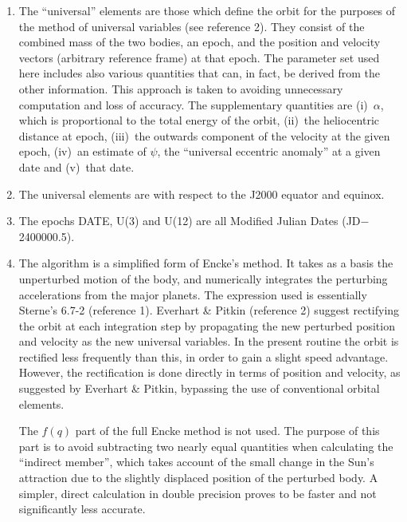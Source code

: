 \documentclass[11pt,twoside,nolof]{starlink}
\begin{document}
{
 \begin{enumerate}
  \setlength{\parskip}{\medskipamount}
  \item The ``universal'' elements are those which define the orbit for the
        purposes of the method of universal variables (see reference 2).
        They consist of the combined mass of the two bodies, an epoch,
        and the position and velocity vectors (arbitrary reference frame)
        at that epoch.  The parameter set used here includes also various
        quantities that can, in fact, be derived from the other
        information.  This approach is taken to avoiding unnecessary
        computation and loss of accuracy.  The supplementary quantities
        are (i)~$\alpha$, which is proportional to the total energy of the
        orbit, (ii)~the heliocentric distance at epoch,
        (iii)~the outwards component of the velocity at the given epoch,
        (iv)~an estimate of $\psi$, the ``universal eccentric anomaly'' at a
        given date and (v)~that date.

  \item The universal elements are with respect to the J2000 equator and
        equinox.

  \item The epochs DATE, U(3) and U(12) are all Modified Julian Dates
        (JD$-$2400000.5).

  \item The algorithm is a simplified form of Encke's method.  It takes as
        a basis the unperturbed motion of the body, and numerically
        integrates the perturbing accelerations from the major planets.
        The expression used is essentially Sterne's 6.7-2 (reference 1).
        Everhart \& Pitkin (reference 2) suggest rectifying the orbit at
        each integration step by propagating the new perturbed position
        and velocity as the new universal variables.  In the present
        routine the orbit is rectified less frequently than this, in order
        to gain a slight speed advantage.  However, the rectification is
        done directly in terms of position and velocity, as suggested by
        Everhart \& Pitkin, bypassing the use of conventional orbital
        elements.

        The $f(q)$ part of the full Encke method is not used.  The purpose
        of this part is to avoid subtracting two nearly equal quantities
        when calculating the ``indirect member'', which takes account of the
        small change in the Sun's attraction due to the slightly displaced
        position of the perturbed body.  A simpler, direct calculation in
        double precision proves to be faster and not significantly less
        accurate.


\end{enumerate}}
\end{document}
